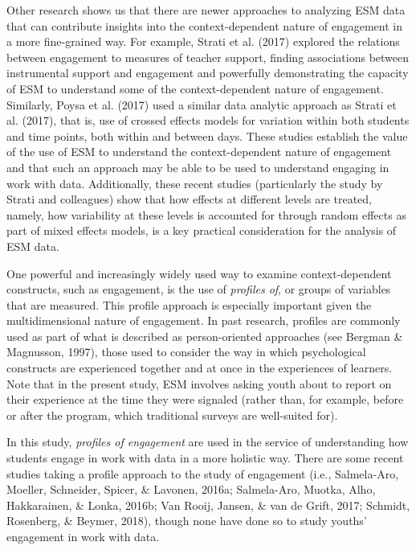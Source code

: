 \documentclass[]{book}
\theoremstyle{definition}
\theoremstyle{definition}
\theoremstyle{definition}
\theoremstyle{remark}
\begin{document}
Other research shows us that there are newer approaches to analyzing ESM
data that can contribute insights into the context-dependent nature of
engagement in a more fine-grained way. For example, Strati et al. (2017)
explored the relations between engagement to measures of teacher
support, finding associations between instrumental support and
engagement and powerfully demonstrating the capacity of ESM to
understand some of the context-dependent nature of engagement.
Similarly, Poysa et al. (2017) used a similar data analytic approach as
Strati et al. (2017), that is, use of crossed effects models for
variation within both students and time points, both within and between
days. These studies establish the value of the use of ESM to understand
the context-dependent nature of engagement and that such an approach may
be able to be used to understand engaging in work with data.
Additionally, these recent studies (particularly the study by Strati and
colleagues) show that how effects at different levels are treated,
namely, how variability at these levels is accounted for through random
effects as part of mixed effects models, is a key practical
consideration for the analysis of ESM data.

One powerful and increasingly widely used way to examine
context-dependent constructs, such as engagement, is the use of
\emph{profiles of}, or groups of variables that are measured. This
profile approach is especially important given the multidimensional
nature of engagement. In past research, profiles are commonly used as
part of what is described as person-oriented approaches (see Bergman \&
Magnusson, 1997), those used to consider the way in which psychological
constructs are experienced together and at once in the experiences of
learners. Note that in the present study, ESM involves asking youth
about to report on their experience at the time they were signaled
(rather than, for example, before or after the program, which
traditional surveys are well-suited for).

In this study, \emph{profiles of engagement} are used in the service of
understanding how students engage in work with data in a more holistic
way. There are some recent studies taking a profile approach to the
study of engagement (i.e., Salmela-Aro, Moeller, Schneider, Spicer, \&
Lavonen, 2016a; Salmela-Aro, Muotka, Alho, Hakkarainen, \& Lonka, 2016b;
Van Rooij, Jansen, \& van de Grift, 2017; Schmidt, Rosenberg, \& Beymer,
2018), though none have done so to study youths' engagement in work with
data.
\end{document}
